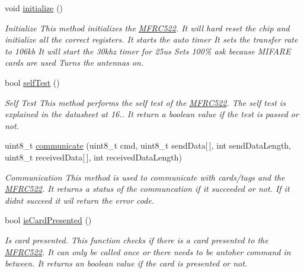 \begin{DoxyCompactItemize}
\mbox{\label{classMFRC522_a09f08823fbb8368bf5a597f210d629c1}} 
void \hyperlink{classMFRC522_a09f08823fbb8368bf5a597f210d629c1}{initialize} ()
\begin{DoxyCompactList}\small\item\em Initialize  This method initialize\textquotesingle{}s the \hyperlink{classMFRC522}{M\+F\+R\+C522}. It will hard reset the chip and initialize all the correct registers. It starts the auto timer It sets the transfer rate to 106kb It will start the 30khz timer for 25us Sets 100\% ask because M\+I\+F\+A\+RE cards are used Turns the antennas on. \end{DoxyCompactList}\item 
\mbox{\label{classMFRC522_a682e7232aee2470878fda4790cbceddd}} 
bool \hyperlink{classMFRC522_a682e7232aee2470878fda4790cbceddd}{self\+Test} ()
\begin{DoxyCompactList}\small\item\em Self Test  This method performs the self test of the \hyperlink{classMFRC522}{M\+F\+R\+C522}. The self test is explained in the datasheet at 16.. It return a boolean value if the test is passed or not. \end{DoxyCompactList}\item 
uint8\+\_\+t \hyperlink{classMFRC522_a993001f188f0f068d59442d1a8934dec}{communicate} (uint8\+\_\+t cmd, uint8\+\_\+t send\+Data\mbox{[}$\,$\mbox{]}, int send\+Data\+Length, uint8\+\_\+t received\+Data\mbox{[}$\,$\mbox{]}, int received\+Data\+Length)
\begin{DoxyCompactList}\small\item\em Communication  This method is used to communicate with cards/tags and the \hyperlink{classMFRC522}{M\+F\+R\+C522}. It returns a status of the communcation if it succeeded or not. If it didnt succeed it wil return the error code. \end{DoxyCompactList}\item 
\mbox{\label{classMFRC522_af0780a36061b7ebc5dad0acda081985e}} 
bool \hyperlink{classMFRC522_af0780a36061b7ebc5dad0acda081985e}{is\+Card\+Presented} ()
\begin{DoxyCompactList}\small\item\em Is card presented.  This function checks if there is a card presented to the \hyperlink{classMFRC522}{M\+F\+R\+C522}. It can only be called once or there needs to be antoher command in between. It returns an boolean value if the card is presented or not. \end{DoxyCompactList}\item 

\end{DoxyCompactItemize}
